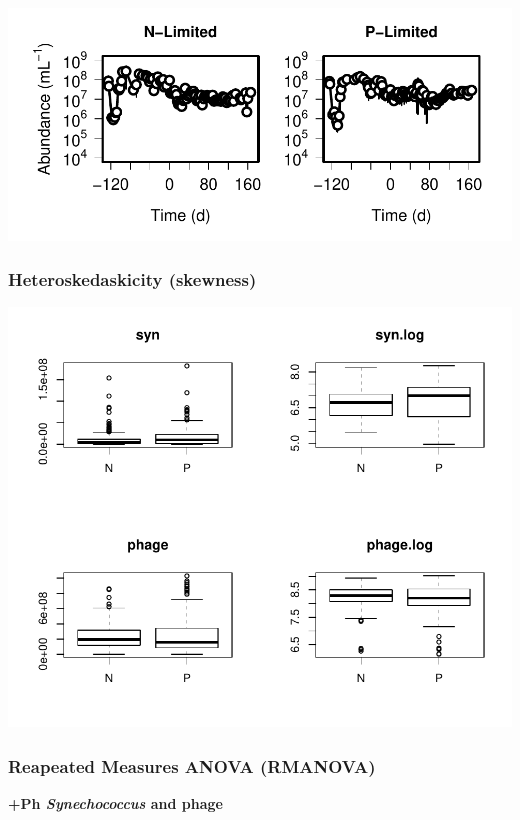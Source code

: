 \documentclass[]{article}
\begin{document}
\includegraphics{analysis_ecoevostoich_files/figure-latex/unnamed-chunk-7-1.pdf}
\newpage

\subsubsection{Heteroskedaskicity
(skewness)}\label{heteroskedaskicity-skewness}

\includegraphics{analysis_ecoevostoich_files/figure-latex/unnamed-chunk-8-1.pdf}

\newpage

\subsubsection{Reapeated Measures ANOVA
(RMANOVA)}\label{reapeated-measures-anova-rmanova}

\textbf{+Ph \emph{Synechococcus} and phage}
\end{document}
